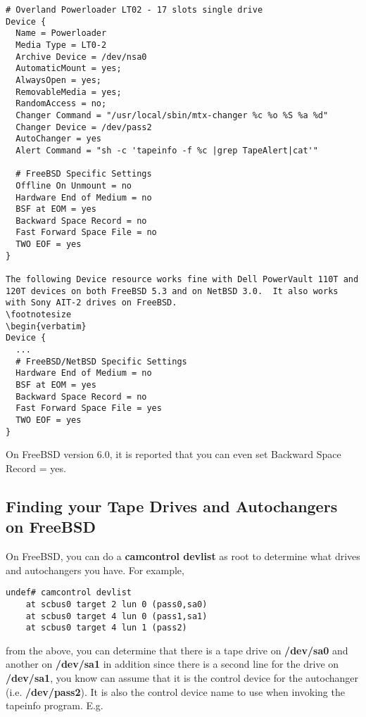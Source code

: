 \footnotesize
\begin{verbatim}
# Overland Powerloader LT02 - 17 slots single drive
Device {
  Name = Powerloader
  Media Type = LT0-2
  Archive Device = /dev/nsa0
  AutomaticMount = yes;              
  AlwaysOpen = yes;
  RemovableMedia = yes;
  RandomAccess = no;
  Changer Command = "/usr/local/sbin/mtx-changer %c %o %S %a %d"
  Changer Device = /dev/pass2
  AutoChanger = yes
  Alert Command = "sh -c 'tapeinfo -f %c |grep TapeAlert|cat'"

  # FreeBSD Specific Settings
  Offline On Unmount = no
  Hardware End of Medium = no
  BSF at EOM = yes
  Backward Space Record = no
  Fast Forward Space File = no
  TWO EOF = yes
}

The following Device resource works fine with Dell PowerVault 110T and
120T devices on both FreeBSD 5.3 and on NetBSD 3.0.  It also works
with Sony AIT-2 drives on FreeBSD.
\footnotesize
\begin{verbatim}
Device {
  ...
  # FreeBSD/NetBSD Specific Settings
  Hardware End of Medium = no
  BSF at EOM = yes
  Backward Space Record = no
  Fast Forward Space File = yes
  TWO EOF = yes
}
\end{verbatim}
\normalsize

On FreeBSD version 6.0, it is reported that you can even set
Backward Space Record = yes.



\subsection{Finding your Tape Drives and Autochangers on FreeBSD}

On FreeBSD, you can do a {\bf camcontrol devlist} as root to determine what
drives and autochangers you have. For example, 

\footnotesize
\begin{verbatim}
undef# camcontrol devlist
    at scbus0 target 2 lun 0 (pass0,sa0)
    at scbus0 target 4 lun 0 (pass1,sa1)
    at scbus0 target 4 lun 1 (pass2)
\end{verbatim}
\normalsize

from the above, you can determine that there is a tape drive on {\bf /dev/sa0}
and another on {\bf /dev/sa1} in addition since there is a second line for the
drive on {\bf /dev/sa1}, you know can assume that it is the control device for
the autochanger (i.e. {\bf /dev/pass2}). It is also the control device name to
use when invoking the tapeinfo program. E.g. 

